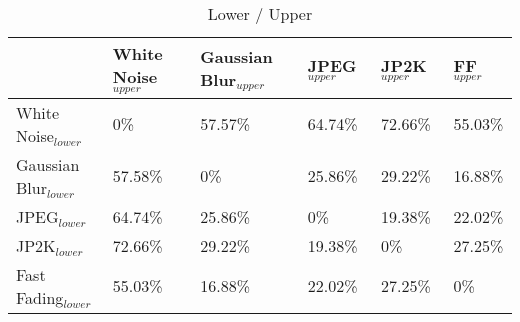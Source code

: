 \begin{table}[]
\centering
\caption{Lower / Upper}
\label{my-label}
\begin{tabular}{|l|l|l|l|l|l|}
\hline
                    & White Noise$_{upper}$ & Gaussian Blur$_{upper}$ & JPEG$_{upper}$ & JP2K$_{upper}$ & FF$_{upper}$ \\ \hline
White Noise$_{lower}$   & 0\%           & 57.57\%      & 64.74\% & 72.66\% & 55.03\%    \\ \hline
Gaussian Blur$_{lower}$ & 57.58\%    & 0\%             & 25.86\% & 29.22\% & 16.88\%    \\ \hline
JPEG$_{lower}$          & 64.74\%    & 25.86\%      & 0\%        & 19.38\% & 22.02\%    \\ \hline
JP2K$_{lower}$          & 72.66\%    & 29.22\%      & 19.38\% & 0\%        & 27.25\%    \\ \hline
Fast Fading$_{lower}$   & 55.03\%    & 16.88\%      & 22.02\% & 27.25\% & 0\%           \\ \hline
\end{tabular}
\end{table}

\begin{comment}
	\begin{table}[]
	\centering
	\caption{Lower / Upper}
	\label{my-label}
	\begin{tabular}{|l|l|l|l|l|l|}
	\hline
	                    & White Noise Upper & Gaussian Blur Upper & JPEG Upper     & JP2K Upper     & Fast Fading Upper \\ \hline
	White Noise Lower   & 0 / 0\%           & 4765 / 57.57\%      & 5358 / 64.74\% & 6013 / 72.66\% & 4554 / 55.03\%    \\ \hline
	Gaussian Blur Lower & 4756 / 57.58\%    & 0 / 0\%             & 2140 / 25.86\% & 2418 / 29.22\% & 1397 / 16.88\%    \\ \hline
	JPEG Lower          & 5358 / 64.74\%    & 2140 / 25.86\%      & 0 / 0\%        & 1604 / 19.38\% & 1822 / 22.02\%    \\ \hline
	JP2K Lower          & 6013 / 72.66\%    & 2418 / 29.22\%      & 1604 / 19.38\% & 0 / 0\%        & 2255 / 27.25\%    \\ \hline
	Fast Fading Lower   & 4554 / 55.03\%    & 1397 / 16.88\%      & 1822 / 22.02\% & 2255 / 27.25\% & 0 / 0\%           \\ \hline
	\end{tabular}
\end{table}
\end{comment}


\begin{comment}
	Results of training Deep IQA for LIVE distortions
	- given model trained on all distortion types in LIVE dataset provided by the authors, finetune to each of the 5 distortions
		- trained for 500 epochs in same training style as Deep IQA
	- best model for each distortion type for further work determined by average of LCC and SROCC for each model
	- these are as follows:
		- GB: 5 - 0.98885
		- WN: 7 - 0.9964
		- JPEG: 7 - 0.974
		- JP2K: 6 - 0.98445
		- FF: 6 - 0.9798

\end{comment}